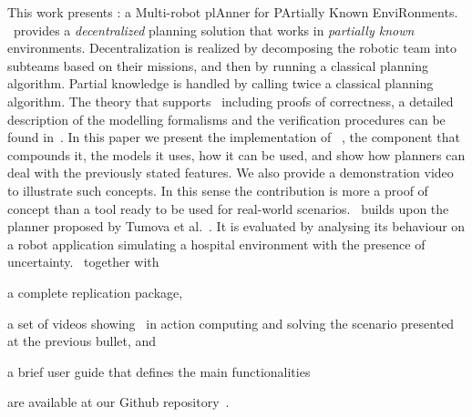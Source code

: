 


This work presents  \toolName: a Multi-robot plAnner for PArtially Known EnviRonments.
 \toolName\ provides a  \emph{decentralized} planning solution that works in \emph{partially known} environments.
Decentralization is realized by decomposing the robotic team into subteams based on their missions, and then by running a classical planning algorithm.
Partial knowledge is handled by calling twice a classical planning algorithm.
The theory that supports \toolName\ including proofs of correctness, a detailed description of the modelling formalisms and the verification procedures can be found in~\cite{menghi2018multi}.
In this paper we present the implementation of \toolName\ , the component that compounds it, the models it uses, how it can be used,  and  show how planners can deal with the previously stated features. 
We also provide a demonstration video to illustrate such concepts.
In this sense the contribution is more a proof of concept than a tool ready to be used for real-world scenarios.
\toolName~builds upon the planner proposed by Tumova et al.~\cite{tumova2016multi}.
It is evaluated by analysing its behaviour on a robot application simulating a hospital environment with the presence of uncertainty.
\toolName\  together with 
\begin{enumerate*}
\item a complete replication package,
\item a set of videos showing \toolName\ in action computing and solving the scenario presented at the previous bullet, and
\item a brief user guide that defines the main functionalities 
\end{enumerate*}
 are available at our Github repository~\cite{repo}. %



